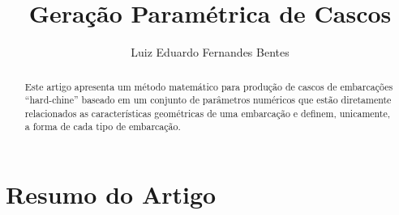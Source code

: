 \documentclass[]{article}
\title{Geração Paramétrica de Cascos}
\author{Luiz Eduardo Fernandes Bentes}
\begin{document}
\maketitle

\begin{abstract}
Este artigo apresenta um método matemático para produção de cascos de embarcações ``hard-chine'' baseado em um conjunto de parâmetros numéricos que estão diretamente relacionados as características geométricas de uma embarcação e definem, unicamente, a forma de cada tipo de embarcação. 
\end{abstract}
\section{Resumo do Artigo}
\subsection{}
\end{document}
